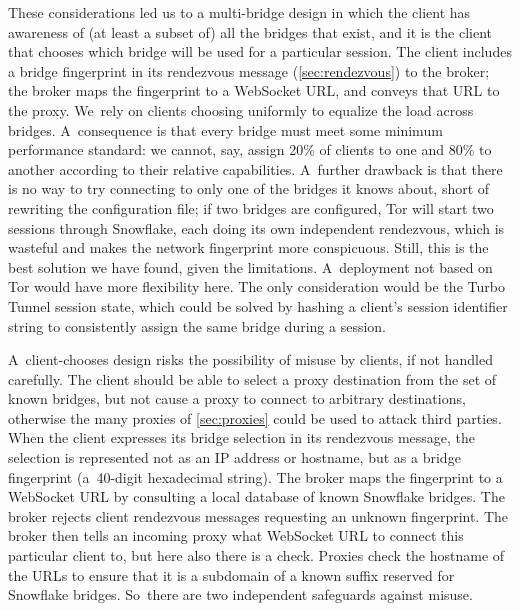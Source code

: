 \documentclass[letterpaper,twocolumn]{article}
\begin{document}
These considerations led us to a multi-bridge design
in which the client has awareness of (at least a subset of)
all the bridges that exist,
and it is the client that chooses which bridge will be used
for a particular session.
The client includes a bridge fingerprint
in its rendezvous message (\autoref{sec:rendezvous}) to the broker;
the broker maps the fingerprint to a WebSocket URL,
and conveys that URL to the proxy.
We~rely on clients choosing uniformly
to equalize the load across bridges.
A~consequence is that
every bridge must meet some minimum performance standard:
we cannot, say,
assign 20\% of clients to one and 80\% to another
according to their relative capabilities.
A~further drawback is that there is no way to try connecting
to only one of the bridges it knows about,
short of rewriting the configuration file;
if two bridges are configured, Tor will start two sessions through Snowflake,
each doing its own independent rendezvous,
which is wasteful and makes the network fingerprint more conspicuous.
Still, this is the best solution we have found, given the limitations.
A~deployment not based on Tor would have more flexibility here.
The only consideration would be the Turbo Tunnel session state,
which could be solved by hashing a client's session identifier string
to consistently assign the same bridge during a session.

A~client-chooses design risks the possibility
of misuse by clients, if not handled carefully.
The client should be able to select
a proxy destination from the set of known bridges,
but not cause a proxy to connect to arbitrary destinations,
otherwise the many proxies of \autoref{sec:proxies}
could be used to attack third parties.
When the client expresses its bridge selection
in its rendezvous message, the selection is represented
not as an IP address or hostname,
but as a bridge fingerprint (a~\mbox{40-digit} hexadecimal string).
The broker maps the fingerprint to a WebSocket URL
by consulting a local database of known Snowflake bridges.
The broker rejects client rendezvous messages requesting an unknown fingerprint.
The broker then tells an incoming proxy
what WebSocket URL to connect this particular client to,
but here also there is a check.
Proxies check the hostname of the URLs
to ensure that it is a subdomain of a known suffix reserved for Snowflake bridges.
So~there are two independent safeguards against misuse.
\end{document}
